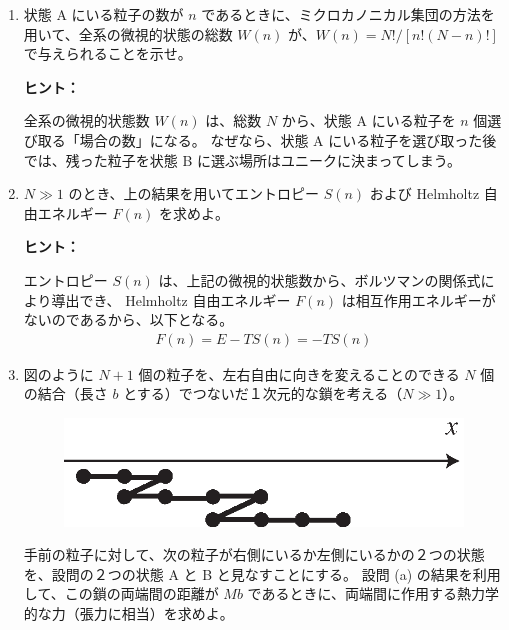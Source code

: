 \documentclass[uplatex,dvipdfmx,a4paper,11pt]{jsarticle}
\begin{document}
\begin{enumerate}
\setlength{\parskip}{0cm} %
\setlength{\itemsep}{0.3cm} %

\item
状態 A にいる粒子の数が $n$ であるときに、ミクロカノニカル集団の方法を用いて、全系の微視的状態の総数 $W(n)$ が、$W(n) = N!/[ n! (N-n)!]$ で与えられることを示せ。

\begin{itembox}[l]{{\bf ヒント：}}

全系の微視的状態数 $W(n)$ は、総数 $N$ から、状態 A にいる粒子を $n$ 個選び取る「場合の数」になる。
なぜなら、状態 A にいる粒子を選び取った後では、残った粒子を状態 B に選ぶ場所はユニークに決まってしまう。

\end{itembox}

\color{black}

\item
$N \gg 1$ のとき、上の結果を用いてエントロピー $S(n)$ および Helmholtz 自由エネルギー $F(n)$ を求めよ。

\begin{itembox}[l]{{\bf ヒント：}}

エントロピー $S(n)$ は、上記の微視的状態数から、ボルツマンの関係式により導出でき、 Helmholtz 自由エネルギー $F(n)$ は相互作用エネルギーがないのであるから、以下となる。
\begin{align*}
F(n) = E - TS(n) = -TS(n)
\end{align*}

\end{itembox}

\color{black}

\item
図のように $N+1$ 個の粒子を、左右自由に向きを変えることのできる $N$ 個の結合（長さ $b$ とする）でつないだ１次元的な鎖を考える（$N \gg 1$）。

\begin{figure}[h]
	\begin{center}
	\includegraphics{./figures/FIG_chain.eps}
	\end{center}
\end{figure}
手前の粒子に対して、次の粒子が右側にいるか左側にいるかの２つの状態を、設問の２つの状態 A と B と見なすことにする。
設問 (a) の結果を利用して、この鎖の両端間の距離が $Mb$ であるときに、両端間に作用する熱力学的な力（張力に相当）を求めよ。


\end{enumerate}
\end{document}
